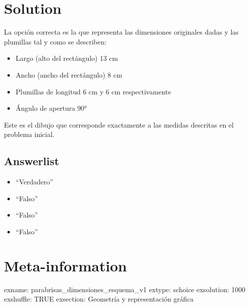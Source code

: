 \documentclass[
]{article}
\providecommand{\tightlist}{%
  \setlength{\itemsep}{0pt}\setlength{\parskip}{0pt}}
\begin{document}
\section{Solution}\label{solution}

La opción correcta es la que representa las dimensiones originales dadas
y las plumillas tal y como se describen:

\begin{itemize}
\tightlist
\item
  Largo (alto del rectángulo) 13 cm
\item
  Ancho (ancho del rectángulo) 8 cm
\item
  Plumillas de longitud 6 cm y 6 cm respectivamente
\item
  Ángulo de apertura 90°
\end{itemize}

Este es el dibujo que corresponde exactamente a las medidas descritas en
el problema inicial.

\subsection{Answerlist}\label{answerlist-1}

\begin{itemize}
\tightlist
\item
  ``Verdadero''
\item
  ``Falso''
\item
  ``Falso''
\item
  ``Falso''
\end{itemize}

\section{Meta-information}\label{meta-information}

exname: parabrisas\_dimensiones\_esquema\_v1 extype: schoice exsolution:
1000 exshuffle: TRUE exsection: Geometría y representación gráfica
\end{document}
